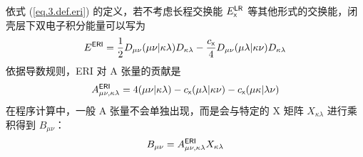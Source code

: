 依式 (\ref{eq.3.def.eri}) 的定义，若不考虑长程交换能 $E_{\textsf{x}}^{\textsf{LR}}$ 等其他形式的交换能，闭壳层下双电子积分能量可以写为
\begin{equation*}
    E^{\textsf{ERI}} = \frac{1}{2} D_{\mu \nu} (\mu \nu | \kappa \lambda) D_{\kappa \lambda} - \frac{c_{\textsf{x}}}{4} D_{\mu \nu} (\mu \lambda | \kappa \nu) D_{\kappa \lambda}
\end{equation*}
依据导数规则，ERI 对 A 张量的贡献是
\begin{equation}
    \label{eq.3.deduct.A-eri-expand}
    A_{\mu \nu, \kappa \lambda}^{\textsf{ERI}} = 4 (\mu \nu | \kappa \lambda) - c_{\textsf{x}} (\mu \lambda | \kappa \nu) - c_{\textsf{x}} (\mu \kappa | \lambda \nu)
\end{equation}
在程序计算中，一般 A 张量不会单独出现，而是会与特定的 X 矩阵 $X_{\kappa \lambda}$ 进行乘积得到 $B_{\mu \nu}$：
\begin{equation}
    \label{eq.3.ax-to-b-eri}
    B_{\mu \nu} = A_{\mu \nu, \kappa \lambda}^{\textsf{ERI}} X_{\kappa \lambda}
\end{equation}

